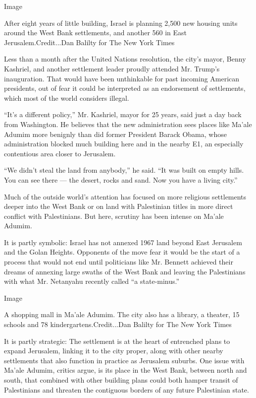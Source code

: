 Image

After eight years of little building, Israel is planning 2,500 new
housing units around the West Bank settlements, and another 560 in East
Jerusalem.Credit...Dan Balilty for The New York Times

Less than a month after the United Nations resolution, the city's mayor,
Benny Kashriel, and another settlement leader proudly attended Mr.
Trump's inauguration. That would have been unthinkable for past incoming
American presidents, out of fear it could be interpreted as an
endorsement of settlements, which most of the world considers illegal.

``It's a different policy,'' Mr. Kashriel, mayor for 25 years, said just
a day back from Washington. He believes that the new administration sees
places like Ma'ale Adumim more benignly than did former President Barack
Obama, whose administration blocked much building here and in the nearby
E1, an especially contentious area closer to Jerusalem.

``We didn't steal the land from anybody,'' he said. ``It was built on
empty hills. You can see there --- the desert, rocks and sand. Now you
have a living city.''

Much of the outside world's attention has focused on more religious
settlements deeper into the West Bank or on land with Palestinian titles
in more direct conflict with Palestinians. But here, scrutiny has been
intense on Ma'ale Adumim.

It is partly symbolic: Israel has not annexed 1967 land beyond East
Jerusalem and the Golan Heights. Opponents of the move fear it would be
the start of a process that would not end until politicians like Mr.
Bennett achieved their dreams of annexing large swaths of the West Bank
and leaving the Palestinians with what Mr. Netanyahu recently called ``a
state-minus.''

Image

A shopping mall in Ma'ale Adumim. The city also has a library, a
theater, 15 schools and 78 kindergartens.Credit...Dan Balilty for The
New York Times

It is partly strategic: The settlement is at the heart of entrenched
plans to expand Jerusalem, linking it to the city proper, along with
other nearby settlements that also function in practice as Jerusalem
suburbs. One issue with Ma'ale Adumim, critics argue, is its place in
the West Bank, between north and south, that combined with other
building plans could both hamper transit of Palestinians and threaten
the contiguous borders of any future Palestinian state.

